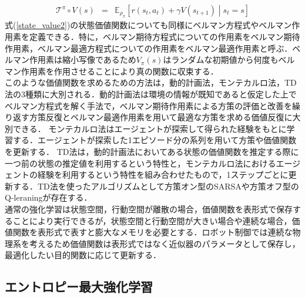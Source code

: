 \documentclass[dvipdfmx]{ampbt_nomag}
\begin{document}
\begin{eqnarray} \label{bellman_operator}
  \mathcal{T}^\pi\circ V(s) &=&  \mathbb{E}_{\rho_\pi} \left[ r(s_t,a_t) + \gamma V(s_{t+1}) \middle|s_t = s\right]
\end{eqnarray}
式(\ref{state_value2})の状態価値関数についても同様にベルマン方程式やベルマン作用素を定義できる．特に，ベルマン期待方程式についての作用素をベルマン期待作用素，ベルマン最適方程式についての作用素をベルマン最適作用素と呼ぶ．ベルマン作用素は縮小写像であるため$V_\pi(s)$はランダムな初期値から何度もベルマン作用素を作用させることにより真の関数に収束する．\\
このような価値関数を求めるための方法は，動的計画法，モンテカルロ法，TD法の3種類に大別される．動的計画法は環境の情報が既知であると仮定した上でベルマン方程式を解く手法で，ベルマン期待作用素による方策の評価と改善を繰り返す方策反復とベルマン最適作用素を用いて最適な方策を求める価値反復に大別できる．
モンテカルロ法はエージェントが探索して得られた経験をもとに学習する．エージェントが探索した1エピソード分の系列を用いて方策や価値関数を更新する．
TD法は，動的計画法においてある状態の価値関数を推定する際に一つ前の状態の推定値を利用するという特性と，モンテカルロ法におけるエージェントの経験を利用するという特性を組み合わせたもので，1ステップごとに更新する．TD法を使ったアルゴリズムとして方策オン型のSARSAや方策オフ型のQ-leraningが存在する．\\
通常の強化学習は状態空間，行動空間が離散の場合，価値関数を表形式で保存することにより実行できるが，状態空間と行動空間が大きい場合や連続な場合，価値関数を表形式で表すと膨大なメモリを必要とする．ロボット制御では連続な物理系を考えるため価値関数は表形式ではなく近似器のパラメータとして保存し，最適化したい目的関数に応じて更新する．

\subsection{エントロピー最大強化学習}
\end{document}
